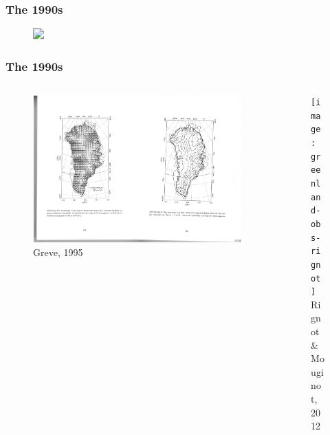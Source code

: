 \documentclass[hide notes,intlimits]{beamer}
\begin{document}
\begin{frame}
  \frametitle{The 1990s}
      \begin{figure}
        \includegraphics<1>[width=\textwidth]{greve-1995}
      \end{figure}
\end{frame}

\begin{frame}
  \frametitle{The 1990s}
      \vspace{-2em}
  \begin{columns}[c]
    \begin{column}{.5\linewidth}
    \begin{figure}
      \includegraphics[height=0.75\textheight]{greve_1995_flow}\\
      \tiny{Greve, 1995}
    \end{figure}
    \end{column}
    \begin{column}{.4\linewidth}
      \begin{figure}
      \texttt{[image: greenland-obs-rignot]}\\
      \tiny{Rignot \& Mouginot, 2012}
      \end{figure}
    \end{column}
  \end{columns}
\end{frame}
\end{document}
